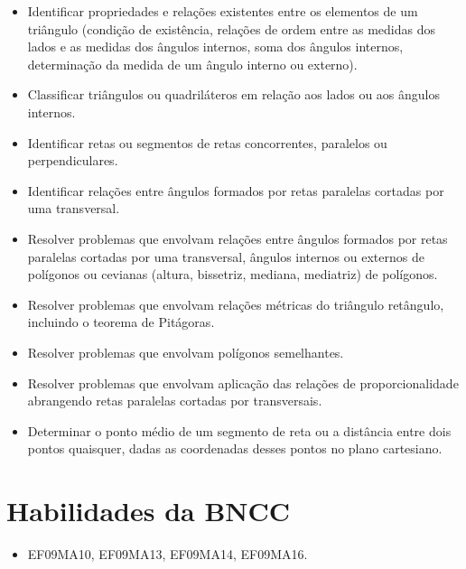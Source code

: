 \begin{itemize}
  \item Identificar propriedades e relações existentes entre os elementos de um
triângulo (condição de existência, relações de ordem entre as medidas dos
lados e as medidas dos ângulos internos, soma dos ângulos internos,
determinação da medida de um ângulo interno ou externo).
  \item Classificar triângulos ou quadriláteros em relação aos lados ou aos
ângulos internos.
  \item Identificar retas ou segmentos de retas concorrentes, paralelos ou
perpendiculares.
  \item Identificar relações entre ângulos formados por retas paralelas cortadas
por uma transversal.
  \item Resolver problemas que envolvam relações entre ângulos formados por
retas paralelas cortadas por uma transversal, ângulos internos ou externos
de polígonos ou cevianas (altura, bissetriz, mediana, mediatriz) de
polígonos.
  \item Resolver problemas que envolvam relações métricas do triângulo
retângulo, incluindo o teorema de Pitágoras.
  \item Resolver problemas que envolvam polígonos semelhantes.
  \item Resolver problemas que envolvam aplicação das relações de
proporcionalidade abrangendo retas paralelas cortadas por transversais.
  \item Determinar o ponto médio de um segmento de reta ou a distância entre
dois pontos quaisquer, dadas as coordenadas desses pontos no plano
cartesiano.
\end{itemize} 

\section*{Habilidades da BNCC}

\begin{itemize}
  \item EF09MA10, EF09MA13, EF09MA14, EF09MA16. 
\end{itemize}

